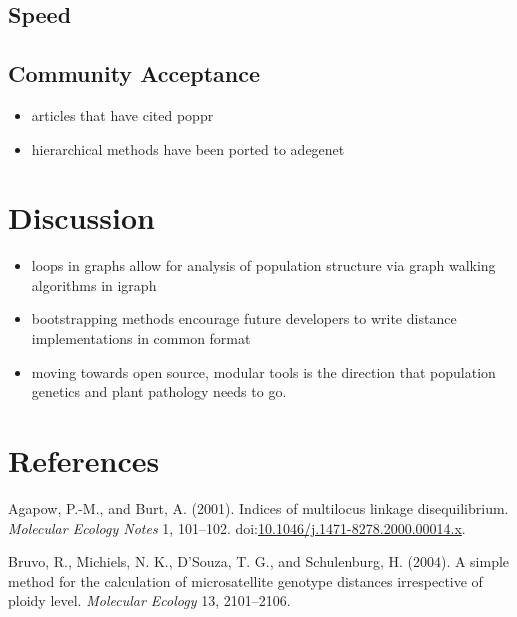 \documentclass{frontiersSCNS} %
\begin{document}
\subsection*{Speed}\label{speed}

\subsection*{Community Acceptance}\label{community-acceptance}

\begin{itemize}
\itemsep1pt\parskip0pt
\item
  articles that have cited poppr
\item
  hierarchical methods have been ported to adegenet
\end{itemize}

\section*{Discussion}\label{discussion}

\begin{itemize}
\itemsep1pt\parskip0pt
\item
  loops in graphs allow for analysis of population structure via graph
  walking algorithms in igraph
\item
  bootstrapping methods encourage future developers to write distance
  implementations in common format
\item
  moving towards open source, modular tools is the direction that
  population genetics and plant pathology needs to go.
\end{itemize}

\section*{References}\label{references}

Agapow, P.-M., and Burt, A. (2001). Indices of multilocus linkage
disequilibrium. \emph{Molecular Ecology Notes} 1, 101--102.
doi:\href{http://dx.doi.org/10.1046/j.1471-8278.2000.00014.x}{10.1046/j.1471-8278.2000.00014.x}.

Bruvo, R., Michiels, N. K., D'Souza, T. G., and Schulenburg, H. (2004).
A simple method for the calculation of microsatellite genotype distances
irrespective of ploidy level. \emph{Molecular Ecology} 13, 2101--2106.
\end{document}
